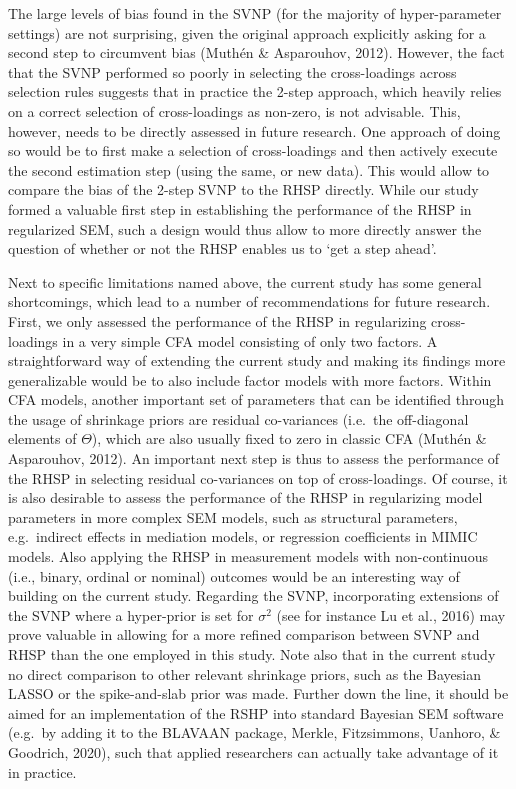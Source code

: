 \documentclass[
  man, donotrepeattitle,floatsintext]{apa6}
\begin{document}
The large levels of bias found in the SVNP (for the majority of hyper-parameter settings) are not surprising, given the original approach explicitly asking for a second step to circumvent bias (Muthén \& Asparouhov, 2012). However, the fact that the SVNP performed so poorly in selecting the cross-loadings across selection rules suggests that in practice the 2-step approach, which heavily relies on a correct selection of cross-loadings as non-zero, is not advisable. This, however, needs to be directly assessed in future research. One approach of doing so would be to first make a selection of cross-loadings and then actively execute the second estimation step (using the same, or new data). This would allow to compare the bias of the 2-step SVNP to the RHSP directly. While our study formed a valuable first step in establishing the performance of the RHSP in regularized SEM, such a design would thus allow to more directly answer the question of whether or not the RHSP enables us to `get a step ahead'.

Next to specific limitations named above, the current study has some general shortcomings, which lead to a number of recommendations for future research. First, we only assessed the performance of the RHSP in regularizing cross-loadings in a very simple CFA model consisting of only two factors. A straightforward way of extending the current study and making its findings more generalizable would be to also include factor models with more factors. Within CFA models, another important set of parameters that can be identified through the usage of shrinkage priors are residual co-variances (i.e.~the off-diagonal elements of \(\Theta\)), which are also usually fixed to zero in classic CFA (Muthén \& Asparouhov, 2012). An important next step is thus to assess the performance of the RHSP in selecting residual co-variances on top of cross-loadings. Of course, it is also desirable to assess the performance of the RHSP in regularizing model parameters in more complex SEM models, such as structural parameters, e.g.~indirect effects in mediation models, or regression coefficients in MIMIC models. Also applying the RHSP in measurement models with non-continuous (i.e., binary, ordinal or nominal) outcomes would be an interesting way of building on the current study. Regarding the SVNP, incorporating extensions of the SVNP where a hyper-prior is set for \(\sigma^2\) (see for instance Lu et al., 2016) may prove valuable in allowing for a more refined comparison between SVNP and RHSP than the one employed in this study. Note also that in the current study no direct comparison to other relevant shrinkage priors, such as the Bayesian LASSO or the spike-and-slab prior was made. Further down the line, it should be aimed for an implementation of the RSHP into standard Bayesian SEM software (e.g.~by adding it to the BLAVAAN package, Merkle, Fitzsimmons, Uanhoro, \& Goodrich, 2020), such that applied researchers can actually take advantage of it in practice.
\end{document}
